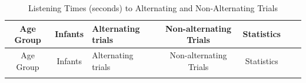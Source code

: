 \documentclass[openright,titlepage,12pt,a4paper]{book}
\begin{document}
\begin{longtable}[]{@{}cclccll@{}}
\caption{\label{tab:ch04tab2} Listening Times (seconds) to Alternating and Non-Alternating Trials}\tabularnewline
\toprule
\begin{minipage}[b]{0.09\columnwidth}\centering
Age Group\strut
\end{minipage} & \begin{minipage}[b]{0.15\columnwidth}\centering
Infants\strut
\end{minipage} & \begin{minipage}[b]{0.15\columnwidth}\raggedright
Alternating trials\strut
\end{minipage} & \begin{minipage}[b]{0.12\columnwidth}\centering
Non-alternating
Trials\strut
\end{minipage} & \begin{minipage}[b]{0.09\columnwidth}\centering
Statistics\strut
\end{minipage} & \begin{minipage}[b]{0.09\columnwidth}\raggedright
\strut
\end{minipage} & \begin{minipage}[b]{0.11\columnwidth}\raggedright
\strut
\end{minipage}\tabularnewline
\midrule
\endfirsthead
\toprule
\begin{minipage}[b]{0.09\columnwidth}\centering
Age Group\strut
\end{minipage} & \begin{minipage}[b]{0.15\columnwidth}\centering
Infants\strut
\end{minipage} & \begin{minipage}[b]{0.15\columnwidth}\raggedright
Alternating trials\strut
\end{minipage} & \begin{minipage}[b]{0.12\columnwidth}\centering
Non-alternating
Trials\strut
\end{minipage} & \begin{minipage}[b]{0.09\columnwidth}\centering
Statistics\strut
\end{minipage} & \begin{minipage}[b]{0.09\columnwidth}\raggedright
\strut
\end{minipage} & \begin{minipage}[b]{0.11\columnwidth}\raggedright
\strut
\end{minipage}\tabularnewline
\midrule
\endhead
\begin{minipage}[t]{0.09\columnwidth}\centering

\end{minipage}
\end{longtable}
\end{document}
